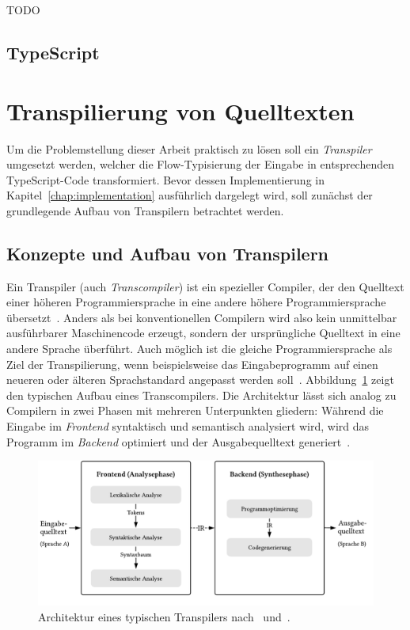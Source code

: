 TODO

\bigbreak


\subsection{TypeScript}

\section{Transpilierung von Quelltexten}
\label{sec:transpilers}

Um die Problemstellung dieser Arbeit praktisch zu lösen soll ein \textit{Transpiler} umgesetzt werden, welcher die Flow-Typisierung der Eingabe in entsprechenden TypeScript-Code transformiert. Bevor dessen Implementierung in Kapitel~\ref{chap:implementation} ausführlich dargelegt wird, soll zunächst der grundlegende Aufbau von Transpilern betrachtet werden.

\subsection{Konzepte und Aufbau von Transpilern}

Ein Transpiler (auch \textit{Transcompiler}) ist ein spezieller Compiler, der den Quelltext einer höheren Programmiersprache in eine andere höhere Programmiersprache übersetzt~\autocite[3]{AHO:COMPILERS}. Anders als bei konventionellen Compilern wird also kein unmittelbar ausführbarer Maschinencode erzeugt, sondern der ursprüngliche Quelltext in eine andere Sprache überführt. Auch möglich ist die gleiche Programmiersprache als Ziel der Transpilierung, wenn beispielsweise das Eingabeprogramm auf einen neueren oder älteren Sprachstandard angepasst werden soll~\autocite{EVGENIY:2016}.
Abbildung~\ref{fig:transpiler-architecture} zeigt den typischen Aufbau eines Transcompilers. Die Architektur lässt sich analog zu Compilern in zwei Phasen mit mehreren Unterpunkten gliedern: Während die Eingabe im \emph{Frontend} syntaktisch und semantisch analysiert wird, wird das Programm im \emph{Backend} optimiert und der Ausgabequelltext generiert~\autocite[136]{APPEL:2003}.

\begin{figure}[htb]
  \includegraphics[width=\textwidth]{src/2_Grundlagen/fig/transpiler-architecture.pdf}
  \caption{Architektur eines typischen Transpilers nach~\autocite{EVGENIY:2016} und~\autocite[8]{TORCZON:2007}.}
	\label{fig:transpiler-architecture}
\end{figure}

